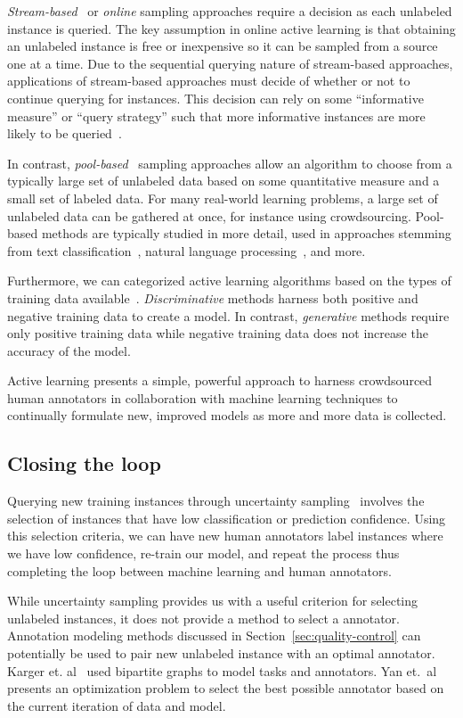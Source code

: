 \documentclass[10pt,twocolumn]{article}
\begin{document}
\textit{Stream-based}~\cite{Freund1997} or \textit{online} sampling 
approaches require a decision as each unlabeled instance is queried. The key
assumption in online active learning is that obtaining an unlabeled instance
is free or inexpensive so it can be sampled from a source one at a time. Due to 
the sequential querying nature of stream-based approaches, applications of 
stream-based approaches must decide of whether or not to continue querying for 
instances. This decision can rely on some ``informative measure'' or ``query 
strategy'' such that more informative instances are more likely to be 
queried~\cite{Settles2010}.

In contrast, \textit{pool-based}~\cite{McCallum1998} sampling approaches allow an algorithm to choose from a typically large set of unlabeled data based on some quantitative measure and a small set of labeled data. For many real-world learning problems, a large set of unlabeled data can be gathered at once, for instance using crowdsourcing. Pool-based methods are typically studied in more detail, used in approaches stemming from text classification~\cite{Lewis1994,Yan2011}, natural language processing~\cite{Snow2008}, and more.

Furthermore, we can categorized active learning algorithms based on the types of 
training data available~\cite{Barrington2012}. \textit{Discriminative} methods 
harness both positive and negative training data to create a model. In contrast, 
\textit{generative} methods require only positive training data while negative 
training data does not increase the accuracy of the model. 

Active learning presents a simple, powerful approach to harness 
crowdsourced human annotators in collaboration with machine learning 
techniques to continually formulate new, improved models as more and more 
data is collected.


\subsection{Closing the loop}
Querying new training instances through uncertainty 
sampling~\cite{Lewis1994} involves the selection of instances that have low 
classification or prediction confidence. Using this selection criteria, we 
can have new human annotators label instances where we have low confidence, 
re-train our model, and repeat the process thus completing the loop between 
machine learning and human annotators.

While uncertainty sampling provides us with a useful criterion for 
selecting unlabeled instances, it does not provide a method to select a 
annotator. Annotation modeling methods discussed in 
Section~\ref{sec:quality-control} can potentially be used to pair new 
unlabeled instance with an optimal annotator. Karger et. al~\cite{Karger} 
used bipartite graphs to model tasks and annotators. Yan et.\ 
al~\cite{Yan2011} presents an optimization problem to select the best 
possible annotator based on the current iteration of data and model.
\end{document}
